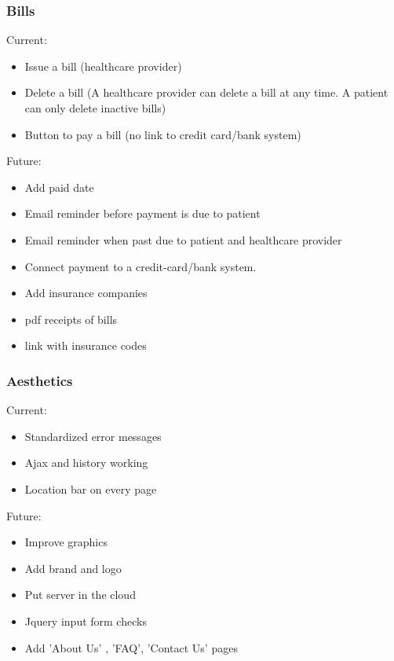 \subsubsection{Bills}
Current:
\begin{itemize}
\item Issue a bill (healthcare provider)
\item Delete a bill (A healthcare provider can delete a bill at any time. A patient can only delete inactive bills)
\item Button to pay a bill (no link to credit card/bank system)
\end{itemize}
Future:
\begin{itemize}
\item Add paid date
\item Email reminder before payment is due to patient
\item Email reminder when past due to patient and healthcare provider
\item Connect payment to a credit-card/bank system.
\item Add insurance companies
\item pdf receipts of bills
\item link with insurance codes
\end{itemize}

\subsubsection{Aesthetics}
Current:
\begin{itemize}
\item Standardized error messages
\item Ajax and history working
\item Location bar on every page
\end{itemize}
Future: 
\begin{itemize}
\item Improve graphics
\item Add brand and logo
\item Put server in the cloud
\item Jquery input form checks
\item Add 'About Us' , 'FAQ', 'Contact Us' pages 
\end{itemize}

